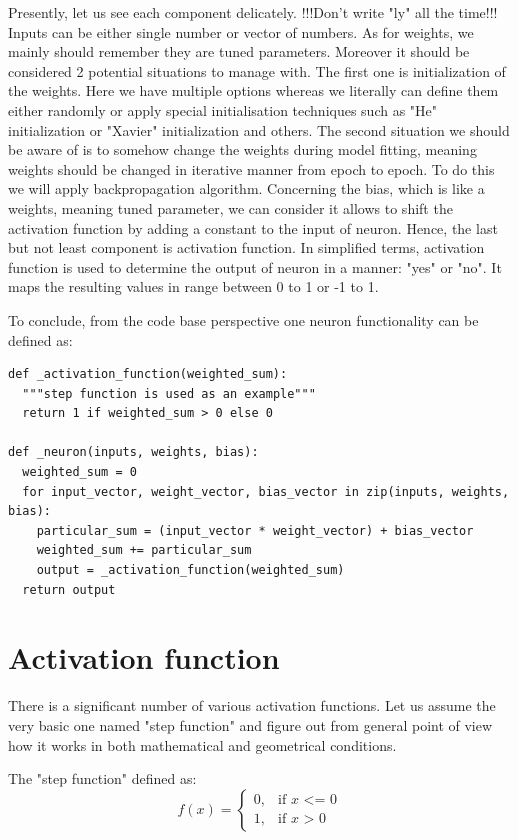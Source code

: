 Presently, let us see each component delicately. !!!Don't write "ly" all the time!!!
Inputs can be either single number or vector of numbers. As for weights, we mainly should remember they are tuned parameters. Moreover it should be considered 2 potential situations to manage with. The first one is initialization of the weights. Here we have multiple options whereas we literally can define them either randomly or apply special initialisation techniques such as "He" initialization or "Xavier" initialization and others. The second situation we should be aware of is to somehow change the weights during model fitting, meaning weights should be changed in iterative manner from epoch to epoch. To do this we will apply backpropagation algorithm. Concerning the bias, which is like a weights, meaning tuned parameter, we can consider it allows to shift the activation function by adding a constant to the input of neuron. Hence, the last but not least component is activation function. In simplified terms, activation function is used to determine the output of neuron in a manner: "yes" or "no". It maps the resulting values in range between 0 to 1 or -1 to 1.            

To conclude, from the code base perspective one neuron functionality can be defined as:
\begin{lstlisting}
def _activation_function(weighted_sum):
  """step function is used as an example"""
  return 1 if weighted_sum > 0 else 0

def _neuron(inputs, weights, bias):
  weighted_sum = 0
  for input_vector, weight_vector, bias_vector in zip(inputs, weights, bias):
    particular_sum = (input_vector * weight_vector) + bias_vector
    weighted_sum += particular_sum
    output = _activation_function(weighted_sum)
  return output
\end{lstlisting}

      
\section{Activation function}
There is a significant number of various activation functions. Let us assume the very basic one named "step function" and figure out from general point of view how it works in both mathematical and geometrical conditions.   

The "step function" defined as:
\[ f(x) = \begin{cases} 0, & \mbox{if } x\mbox{ <= 0} \\ 1, & \mbox{if } x\mbox{ > 0} \end{cases} \]


